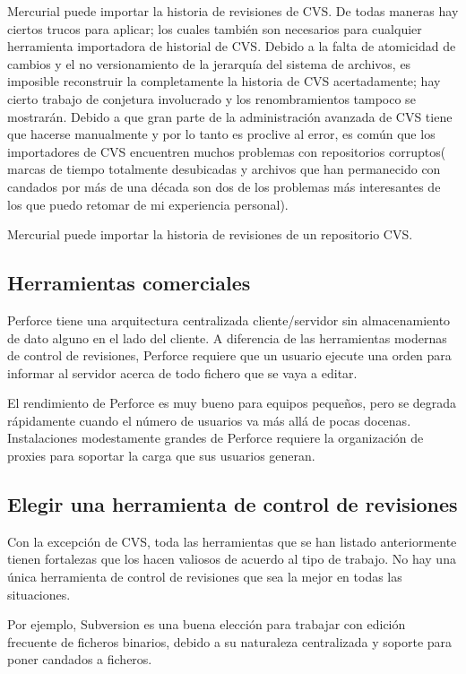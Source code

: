 Mercurial puede importar la historia de revisiones de CVS.  De todas
maneras hay ciertos trucos para aplicar; los cuales también son
necesarios para cualquier herramienta importadora de historial de
CVS. Debido a la falta de atomicidad de cambios y el no versionamiento
de la jerarquía del sistema de archivos, es imposible reconstruir la
completamente la historia de CVS acertadamente; hay cierto trabajo de
conjetura involucrado y los renombramientos tampoco se
mostrarán. Debido a que gran parte de la administración avanzada de
CVS tiene que hacerse manualmente y por lo tanto es proclive al error,
es común que los importadores de CVS encuentren muchos problemas con
repositorios corruptos( marcas de tiempo totalmente desubicadas y
archivos que han permanecido con candados por más de una década son
dos de los problemas más interesantes de los que puedo retomar de mi
experiencia personal).

Mercurial puede importar la historia de revisiones de un repositorio
CVS.

\subsection{Herramientas comerciales}

Perforce tiene una arquitectura centralizada cliente/servidor sin
almacenamiento de dato alguno en el lado del cliente. A diferencia de
las herramientas modernas de control de revisiones, Perforce requiere
que un usuario ejecute una orden para informar al servidor acerca de
todo fichero que se vaya a editar.

El rendimiento de Perforce es muy bueno para equipos pequeños, pero se
degrada rápidamente cuando el número de usuarios va más allá de pocas
docenas. Instalaciones modestamente grandes de Perforce requiere la
organización de proxies para soportar la carga que sus usuarios generan.

\subsection{Elegir una herramienta de control de revisiones}

Con la excepción de CVS, toda las herramientas que se han listado
anteriormente tienen fortalezas que los hacen valiosos de acuerdo al
tipo de trabajo. No hay una única herramienta de control de revisiones
que sea la mejor en todas las situaciones.

Por ejemplo, Subversion es una buena elección para trabajar con
edición frecuente de ficheros binarios, debido a su naturaleza
centralizada y soporte para poner candados a ficheros.

